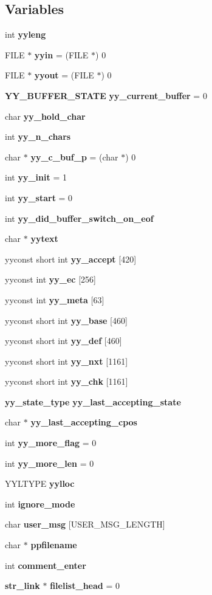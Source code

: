 \subsection*{Variables}
\begin{CompactItemize}
\item 
int {\bf yyleng}
\item 
FILE $\ast$ {\bf yyin} = (FILE $\ast$) 0
\item 
FILE $\ast$ {\bf yyout} = (FILE $\ast$) 0
\item 
{\bf YY\_\-BUFFER\_\-STATE} {\bf yy\_\-current\_\-buffer} = 0
\item 
char {\bf yy\_\-hold\_\-char}
\item 
int {\bf yy\_\-n\_\-chars}
\item 
char $\ast$ {\bf yy\_\-c\_\-buf\_\-p} = (char $\ast$) 0
\item 
int {\bf yy\_\-init} = 1
\item 
int {\bf yy\_\-start} = 0
\item 
int {\bf yy\_\-did\_\-buffer\_\-switch\_\-on\_\-eof}
\item 
char $\ast$ {\bf yytext}
\item 
yyconst short int {\bf yy\_\-accept} [420]
\item 
yyconst int {\bf yy\_\-ec} [256]
\item 
yyconst int {\bf yy\_\-meta} [63]
\item 
yyconst short int {\bf yy\_\-base} [460]
\item 
yyconst short int {\bf yy\_\-def} [460]
\item 
yyconst short int {\bf yy\_\-nxt} [1161]
\item 
yyconst short int {\bf yy\_\-chk} [1161]
\item 
{\bf yy\_\-state\_\-type} {\bf yy\_\-last\_\-accepting\_\-state}
\item 
char $\ast$ {\bf yy\_\-last\_\-accepting\_\-cpos}
\item 
int {\bf yy\_\-more\_\-flag} = 0
\item 
int {\bf yy\_\-more\_\-len} = 0
\item 
YYLTYPE {\bf yylloc}
\item 
int {\bf ignore\_\-mode}
\item 
char {\bf user\_\-msg} [USER\_\-MSG\_\-LENGTH]
\item 
char $\ast$ {\bf ppfilename}
\item 
int {\bf comment\_\-enter}
\item 
{\bf str\_\-link} $\ast$ {\bf filelist\_\-head} = 0

\end{CompactItemize}
